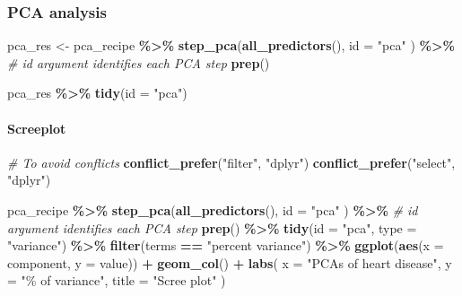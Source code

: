 \documentclass[
]{book}
\newenvironment{Shaded}{\begin{snugshade}}{\end{snugshade}}
\newcommand{\AttributeTok}[1]{\textcolor[rgb]{0.13,0.29,0.53}{#1}}
\newcommand{\CommentTok}[1]{\textcolor[rgb]{0.56,0.35,0.01}{\textit{#1}}}
\newcommand{\FunctionTok}[1]{\textcolor[rgb]{0.13,0.29,0.53}{\textbf{#1}}}
\newcommand{\NormalTok}[1]{#1}
\newcommand{\OtherTok}[1]{\textcolor[rgb]{0.56,0.35,0.01}{#1}}
\newcommand{\SpecialCharTok}[1]{\textcolor[rgb]{0.81,0.36,0.00}{\textbf{#1}}}
\newcommand{\StringTok}[1]{\textcolor[rgb]{0.31,0.60,0.02}{#1}}
\begin{document}
\subsubsection{PCA analysis}\label{pca-analysis}

\begin{Shaded}
\begin{Highlighting}[]
\NormalTok{pca\_res }\OtherTok{\textless{}{-}}\NormalTok{ pca\_recipe }\SpecialCharTok{\%\textgreater{}\%}
  \FunctionTok{step\_pca}\NormalTok{(}\FunctionTok{all\_predictors}\NormalTok{(),}
    \AttributeTok{id =} \StringTok{"pca"}
\NormalTok{  ) }\SpecialCharTok{\%\textgreater{}\%} \CommentTok{\# id argument identifies each PCA step}
  \FunctionTok{prep}\NormalTok{()}

\NormalTok{pca\_res }\SpecialCharTok{\%\textgreater{}\%}
  \FunctionTok{tidy}\NormalTok{(}\AttributeTok{id =} \StringTok{"pca"}\NormalTok{)}
\end{Highlighting}
\end{Shaded}

\paragraph{Screeplot}\label{screeplot}

\begin{Shaded}
\begin{Highlighting}[]
\CommentTok{\# To avoid conflicts}
\FunctionTok{conflict\_prefer}\NormalTok{(}\StringTok{"filter"}\NormalTok{, }\StringTok{"dplyr"}\NormalTok{)}
\FunctionTok{conflict\_prefer}\NormalTok{(}\StringTok{"select"}\NormalTok{, }\StringTok{"dplyr"}\NormalTok{)}

\NormalTok{pca\_recipe }\SpecialCharTok{\%\textgreater{}\%}
  \FunctionTok{step\_pca}\NormalTok{(}\FunctionTok{all\_predictors}\NormalTok{(),}
    \AttributeTok{id =} \StringTok{"pca"}
\NormalTok{  ) }\SpecialCharTok{\%\textgreater{}\%} \CommentTok{\# id argument identifies each PCA step}
  \FunctionTok{prep}\NormalTok{() }\SpecialCharTok{\%\textgreater{}\%}
  \FunctionTok{tidy}\NormalTok{(}\AttributeTok{id =} \StringTok{"pca"}\NormalTok{, }\AttributeTok{type =} \StringTok{"variance"}\NormalTok{) }\SpecialCharTok{\%\textgreater{}\%}
  \FunctionTok{filter}\NormalTok{(terms }\SpecialCharTok{==} \StringTok{"percent variance"}\NormalTok{) }\SpecialCharTok{\%\textgreater{}\%}
  \FunctionTok{ggplot}\NormalTok{(}\FunctionTok{aes}\NormalTok{(}\AttributeTok{x =}\NormalTok{ component, }\AttributeTok{y =}\NormalTok{ value)) }\SpecialCharTok{+}
  \FunctionTok{geom\_col}\NormalTok{() }\SpecialCharTok{+}
  \FunctionTok{labs}\NormalTok{(}
    \AttributeTok{x =} \StringTok{"PCAs of heart disease"}\NormalTok{,}
    \AttributeTok{y =} \StringTok{"\% of variance"}\NormalTok{,}
    \AttributeTok{title =} \StringTok{"Scree plot"}
\NormalTok{  )}
\end{Highlighting}
\end{Shaded}
\end{document}
